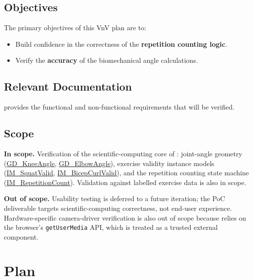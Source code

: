 \documentclass[12pt, titlepage]{article}
\begin{document}
\subsection{Objectives}
The primary objectives of this VnV plan are to:
\begin{itemize}
    \item Build confidence in the correctness of the \textbf{repetition counting logic}.
    \item Verify the \textbf{accuracy} of the biomechanical angle calculations.
\end{itemize}

\subsection{Relevant Documentation}
\citet{SRS} provides the functional and non-functional requirements that will be verified.

\subsection{Scope}
\textbf{In scope.} Verification of the scientific-computing core of
\progname{}: joint-angle geometry (\hyperref[GD_KneeAngle]{GD\_KneeAngle},
\hyperref[GD_ElbowAngle]{GD\_ElbowAngle}), exercise validity instance
models (\hyperref[IM_SquatValid]{IM\_SquatValid},
\hyperref[IM_BicepCurlValid]{IM\_BicepCurlValid}), and the repetition
counting state machine (\hyperref[IM_RepetitionCount]{IM\_RepetitionCount}).
Validation against labelled exercise data is also in scope.

\textbf{Out of scope.} Usability testing is deferred to a future
iteration; the PoC deliverable targets scientific-computing correctness,
not end-user experience. Hardware-specific camera-driver verification is
also out of scope because \progname{} relies on the browser's
\texttt{getUserMedia} API, which is treated as a trusted external
component.

\section{Plan}
\end{document}
